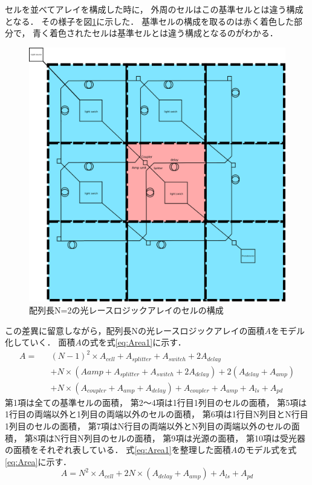 セルを並べてアレイを構成した時に，
外周のセルはこの基準セルとは違う構成となる．
その様子を図\ref{fig:N=2_1}に示した．
基準セルの構成を取るのは赤く着色した部分で，
青く着色されたセルは基準セルとは違う構成となるのがわかる．
\begin{figure}[t!]
\begin{center}
\includegraphics[keepaspectratio,scale=0.3]{fig/4/lightracelogic_N_2_1.png}
\caption{配列長N=2の光レースロジックアレイのセルの構成}
\label{fig:N=2_1}
\end{center}
\end{figure}
この差異に留意しながら，配列長Nの光レースロジックアレイの面積$A$をモデル化していく．
面積$A$の式を式\ref{eq:Area1}に示す．
\begin{eqnarray}
A = &&(N-1)^2 \times A_{cell} 
+ A_{splitter}+A_{switch}+2A_{delay}
\nonumber \\
&&+ N \times (A{amp}+A_{splitter}+A_{switch}+2A_{delay}) 
+ 2 (A_{delay}+A_{amp}) 
\nonumber \\
&&+ N \times (A_{coupler}+A_{amp}+A_{delay})
+A_{coupler}+A_{amp}
+A_{ls}+A_{pd}
\label{eq:Area1}
\end{eqnarray}
第1項は全ての基準セルの面積，
第2〜4項は1行目1列目のセルの面積，
第5項は1行目の両端以外と1列目の両端以外のセルの面積，
第6項は1行目N列目とN行目1列目のセルの面積，
第7項はN行目の両端以外とN列目の両端以外のセルの面積，
第8項はN行目N列目のセルの面積，
第9項は光源の面積，
第10項は受光器の面積をそれぞれ表している．
式\ref{eq:Area1}を整理した面積$A$のモデル式を式\ref{eq:Area}に示す．
\begin{equation}
A = N^2 \times A_{cell} + 2N \times (A_{delay}+A_{amp}) +A_{ls}+A_{pd}
\label{eq:Area}
\end{equation}

